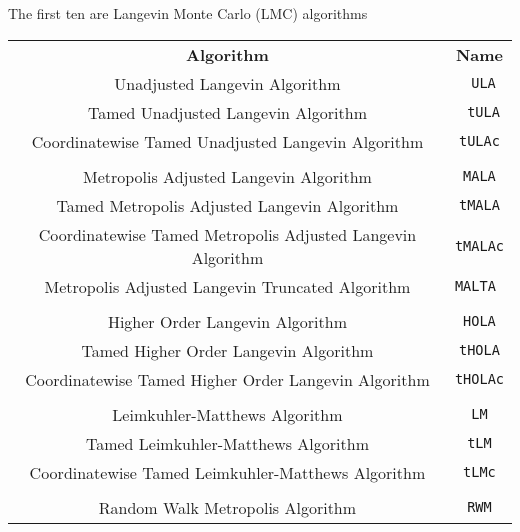 \documentclass[a4paper]{article}
\theoremstyle{definition}
\begin{document}
\begin{center}
\vspace{2cm}
The first ten are Langevin Monte Carlo (LMC) algorithms\\
\vspace{1cm}
\begin{tabular}{cc}
	\textbf{Algorithm} & \textbf{Name} \\ 
	Unadjusted Langevin Algorithm &\texttt{ ULA} \\ 
	Tamed Unadjusted Langevin Algorithm &\texttt{ tULA} \\ 
	Coordinatewise Tamed Unadjusted Langevin Algorithm & \texttt{tULAc} \\ 
	&  \\ 
	Metropolis Adjusted Langevin Algorithm & \texttt{MALA} \\ 
	Tamed Metropolis Adjusted Langevin Algorithm & \texttt{tMALA} \\ 
	Coordinatewise Tamed Metropolis Adjusted Langevin Algorithm & \texttt{tMALAc} \\ 
	Metropolis Adjusted Langevin Truncated  Algorithm & \texttt{MALTA }\\ 
	&  \\ 
	Higher Order Langevin Algorithm & \texttt{HOLA} \\ 
	Tamed Higher Order Langevin Algorithm & \texttt{tHOLA} \\ 
	Coordinatewise Tamed Higher Order Langevin Algorithm & \texttt{tHOLAc} \\ 
	&  \\ 
	Leimkuhler-Matthews Algorithm & \texttt{LM} \\ 
	Tamed Leimkuhler-Matthews Algorithm & \texttt{tLM} \\ 
	Coordinatewise Tamed Leimkuhler-Matthews Algorithm & \texttt{tLMc} \\ 
	&  \\ 
	Random Walk Metropolis Algorithm & \texttt{RWM} \\ 
\end{tabular} 
\end{center}
\end{document}
